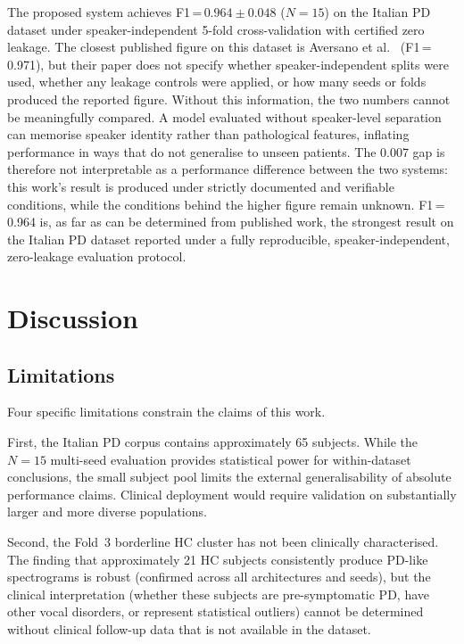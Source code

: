 \documentclass[oneside,openany]{final_report}
\begin{document}
The proposed system achieves F1\,=\,$0.964 \pm 0.048$ ($N\!=\!15$) on the Italian PD dataset under speaker-independent 5-fold cross-validation with certified zero leakage. The closest published figure on this dataset is Aversano et al.~\cite{aversano2022} (F1\,=\,0.971), but their paper does not specify whether speaker-independent splits were used, whether any leakage controls were applied, or how many seeds or folds produced the reported figure. Without this information, the two numbers cannot be meaningfully compared. A model evaluated without speaker-level separation can memorise speaker identity rather than pathological features, inflating performance in ways that do not generalise to unseen patients. The 0.007 gap is therefore not interpretable as a performance difference between the two systems: this work's result is produced under strictly documented and verifiable conditions, while the conditions behind the higher figure remain unknown. F1\,=\,0.964 is, as far as can be determined from published work, the strongest result on the Italian PD dataset reported under a fully reproducible, speaker-independent, zero-leakage evaluation protocol.

\chapter{Discussion}

\section{Limitations}

Four specific limitations constrain the claims of this work.

First, the Italian PD corpus contains approximately 65 subjects. While the $N\!=\!15$ multi-seed evaluation provides statistical power for within-dataset conclusions, the small subject pool limits the external generalisability of absolute performance claims. Clinical deployment would require validation on substantially larger and more diverse populations.

Second, the Fold~3 borderline HC cluster has not been clinically characterised. The finding that approximately 21 HC subjects consistently produce PD-like spectrograms is robust (confirmed across all architectures and seeds), but the clinical interpretation (whether these subjects are pre-symptomatic PD, have other vocal disorders, or represent statistical outliers) cannot be determined without clinical follow-up data that is not available in the dataset.
\end{document}
